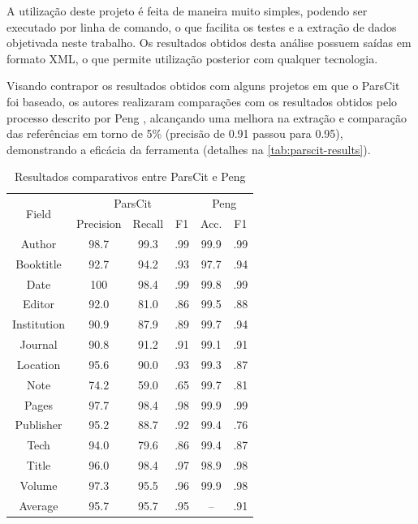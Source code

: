 A utilização deste projeto é feita de maneira muito simples, podendo ser executado por linha de comando, o que facilita os testes e a extração de dados objetivada neste trabalho. Os resultados obtidos desta análise possuem saídas em formato XML, o que permite utilização posterior com qualquer tecnologia.

Visando contrapor os resultados obtidos com alguns projetos em que o ParsCit foi baseado, os autores realizaram comparações com os resultados obtidos pelo processo descrito por Peng \cite{Peng-CRF-IE}, alcançando uma melhora na extração e comparação das referências em torno de 5\% (precisão de 0.91 passou para 0.95), demonstrando a eficácia da ferramenta (detalhes na \autoref{tab:parscit-results}).

\begin{table}[h!]
    \caption{Resultados comparativos entre ParsCit e Peng \cite{Peng-CRF-IE}}
    \begin{center}
        \begin{tabular}{|c|c|c|c|c|c|}
            \hline 
            \multirow{2}{*}{Field} & \multicolumn{3}{c|}{ParsCit} & \multicolumn{2}{c|}{Peng} \\
            \cline{2-6}
             & Precision & Recall & F1 & Acc. & F1 \\ 
            \hline
            Author & 98.7 & 99.3 & .99 & 99.9 & .99 \\
            Booktitle & 92.7 & 94.2 & .93 & 97.7 & .94 \\
            Date & 100 & 98.4 & .99 & 99.8 & .99 \\
            Editor & 92.0 & 81.0 & .86 & 99.5 & .88 \\
            Institution & 90.9 & 87.9 & .89 & 99.7 & .94 \\
            Journal & 90.8 & 91.2 & .91 & 99.1 & .91 \\
            Location & 95.6 & 90.0 & .93 & 99.3 & .87 \\
            Note & 74.2 & 59.0 & .65 & 99.7 & .81 \\
            Pages & 97.7 & 98.4 & .98 & 99.9 & .99  \\
            Publisher & 95.2 & 88.7 & .92 & 99.4 & .76 \\
            Tech & 94.0 & 79.6 & .86 & 99.4 & .87 \\
            Title & 96.0 & 98.4 & .97 & 98.9 & .98 \\
            Volume & 97.3 & 95.5 & .96 & 99.9 & .98 \\
            \hline
            Average & 95.7 & 95.7 & .95 & – & .91 \\
            \hline
        \end{tabular}
    \end{center}
    \label{tab:parscit-results}
\end{table}

